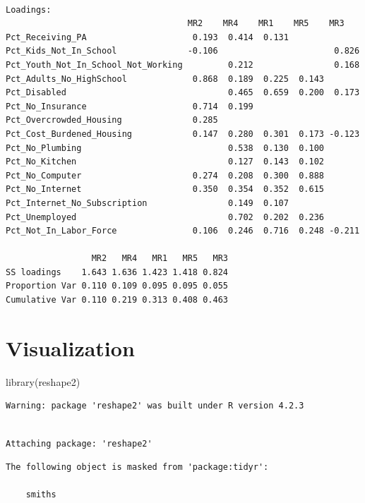 \documentclass[
  letterpaper,
  DIV=11,
  numbers=noendperiod]{scrreprt}
\newenvironment{Shaded}{\begin{snugshade}}{\end{snugshade}}
\newcommand{\FunctionTok}[1]{\textcolor[rgb]{0.28,0.35,0.67}{#1}}
\newcommand{\NormalTok}[1]{\textcolor[rgb]{0.00,0.23,0.31}{#1}}
\begin{document}
\begin{verbatim}

Loadings:
                                    MR2    MR4    MR1    MR5    MR3   
Pct_Receiving_PA                     0.193  0.414  0.131              
Pct_Kids_Not_In_School              -0.106                       0.826
Pct_Youth_Not_In_School_Not_Working         0.212                0.168
Pct_Adults_No_HighSchool             0.868  0.189  0.225  0.143       
Pct_Disabled                                0.465  0.659  0.200  0.173
Pct_No_Insurance                     0.714  0.199                     
Pct_Overcrowded_Housing              0.285                            
Pct_Cost_Burdened_Housing            0.147  0.280  0.301  0.173 -0.123
Pct_No_Plumbing                             0.538  0.130  0.100       
Pct_No_Kitchen                              0.127  0.143  0.102       
Pct_No_Computer                      0.274  0.208  0.300  0.888       
Pct_No_Internet                      0.350  0.354  0.352  0.615       
Pct_Internet_No_Subscription                0.149  0.107              
Pct_Unemployed                              0.702  0.202  0.236       
Pct_Not_In_Labor_Force               0.106  0.246  0.716  0.248 -0.211

                 MR2   MR4   MR1   MR5   MR3
SS loadings    1.643 1.636 1.423 1.418 0.824
Proportion Var 0.110 0.109 0.095 0.095 0.055
Cumulative Var 0.110 0.219 0.313 0.408 0.463
\end{verbatim}

\section{Visualization}\label{visualization}

\begin{Shaded}
\begin{Highlighting}[]
\FunctionTok{library}\NormalTok{(reshape2)}
\end{Highlighting}
\end{Shaded}

\begin{verbatim}
Warning: package 'reshape2' was built under R version 4.2.3
\end{verbatim}

\begin{verbatim}

Attaching package: 'reshape2'
\end{verbatim}

\begin{verbatim}
The following object is masked from 'package:tidyr':

    smiths
\end{verbatim}
\end{document}
